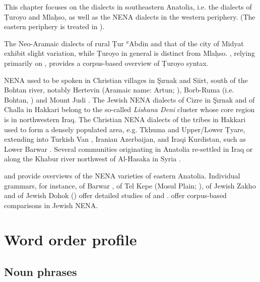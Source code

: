 \documentclass[output=paper,colorlinks,citecolor=brown,draftmode]{langscibook}
\begin{document}
This chapter focuses on the dialects in southeastern Anatolia, i.e. the dialects of Ṭuroyo and Mlaḥso, as well as the NENA dialects in the western periphery. (The eastern periphery is treated in ).

The Neo-Aramaic dialects of rural Ṭur ʿAbdin and that of the city of Midyat exhibit slight variation, while Ṭuroyo in general is distinct from Mlaḥso. \citet{Waltisberg2016STuroyo}, relying primarily on \citet{Ritter1967Turoyo}, provides a corpus-based overview of Ṭuroyo syntax.

NENA used to be spoken in Christian villages in Şırnak and Siirt, south of the Bohtan river, notably Hertevin (Aramaic name: Artun; \citealt{Jastrow1988NAHertevin}), Borb-Ruma (i.e. Bohtan, \citealt{Fox2009NABohtan}) and Mount Judi \citep{Sinha2000NABespen}. The Jewish NENA dialects of Cizre \citep{Nakano1973Gzira} in Şırnak and of Challa \citep{Fassberg2010} in Hakkari belong to the so-called \textit{Lishana Deni} cluster whose core region is in northwestern Iraq. The Christian NENA dialects of the tribes in Hakkari used to form a densely populated area, e.g. Tkhuma and Upper/Lower Ṭyare, extending into Turkish Van \citep{Tsereteli1963}, Iranian Azerbaijan, and Iraqi Kurdistan, such as Lower Barwar \citep{Khan2008JUrmi}. Several communities originating in Anatolia re-settled in Iraq or along the Khabur river northwest of Al-Hasaka in Syria \citep{Talay2008NAKhaburAssyrer,Talay2009NAKhaburAssyrer}.

\citet{Talay2008NAKhaburAssyrer} and \citet{Khan2019Anatolia} provide overviews of the NENA varieties of eastern Anatolia. Individual grammars, for instance, of Barwar \citep[823--950]{Khan2008JUrmi}, of Tel Kepe (Mosul Plain; \citealt{Coghill2018ISNA}), of Jewish Zakho \citep{Cohen2012NENAZaxo} and of Jewish Dohok (\citealt{Molin2024JDuhok}) offer detailed studies of  and . \citet{NoorlanderMolin2022WordOrder} offer corpus-based  comparisons in Jewish NENA.

\section{Word order profile}

\subsection{Noun phrases}\label{Arabic:2.1}
\end{document}
